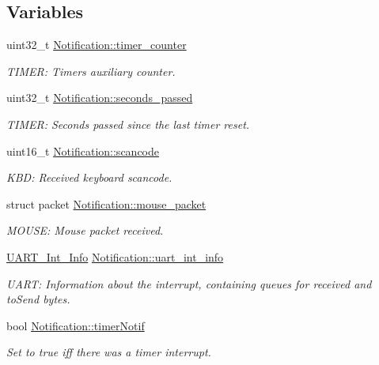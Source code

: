 \subsection*{Variables}
\begin{DoxyCompactItemize}
\item 
uint32\+\_\+t \mbox{\hyperlink{group__interrupts_ga4b14f767b21a6ae59f9832df85ac2338}{Notification\+::timer\+\_\+counter}}
\begin{DoxyCompactList}\small\item\em T\+I\+M\+ER\+: Timer\textquotesingle{}s auxiliary counter. \end{DoxyCompactList}\item 
uint32\+\_\+t \mbox{\hyperlink{group__interrupts_ga7f2430cd3f169c5f1fd04426301adebf}{Notification\+::seconds\+\_\+passed}}
\begin{DoxyCompactList}\small\item\em T\+I\+M\+ER\+: Seconds passed since the last timer reset. \end{DoxyCompactList}\item 
uint16\+\_\+t \mbox{\hyperlink{group__interrupts_ga9744d7e28d7785b2f3ef9e9dfedcbbf8}{Notification\+::scancode}}
\begin{DoxyCompactList}\small\item\em K\+BD\+: Received keyboard scancode. \end{DoxyCompactList}\item 
struct packet \mbox{\hyperlink{group__interrupts_ga44ddd85ef55e76d85d28b611b892ee49}{Notification\+::mouse\+\_\+packet}}
\begin{DoxyCompactList}\small\item\em M\+O\+U\+SE\+: Mouse packet received. \end{DoxyCompactList}\item 
\mbox{\hyperlink{struct_u_a_r_t___int___info}{U\+A\+R\+T\+\_\+\+Int\+\_\+\+Info}} \mbox{\hyperlink{group__interrupts_ga440aaa950e50448a628bba417bce3ce7}{Notification\+::uart\+\_\+int\+\_\+info}}
\begin{DoxyCompactList}\small\item\em U\+A\+RT\+: Information about the interrupt, containing queues for received and to\+Send bytes. \end{DoxyCompactList}\item 
bool \mbox{\hyperlink{group__interrupts_gaba77f917764b3f473bccd4d28f9ab312}{Notification\+::timer\+Notif}}
\begin{DoxyCompactList}\small\item\em Set to true iff there was a timer interrupt. \end{DoxyCompactList}\item 

\end{DoxyCompactItemize}
